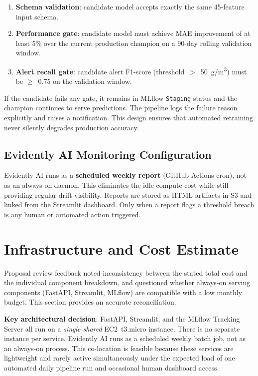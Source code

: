 \documentclass[12pt,a4paper]{report}
\begin{document}
\begin{enumerate}
  \item \textbf{Schema validation}: candidate model accepts exactly the same 45-feature input schema.
  \item \textbf{Performance gate}: candidate model must achieve MAE improvement of at least 5\% over the current production champion on a 90-day rolling validation window.
  \item \textbf{Alert recall gate}: candidate alert F1-score (threshold~$>$~50~\textmu g/m\textsuperscript{3}) must be $\geq$~0.75 on the validation window.
\end{enumerate}

If the candidate fails any gate, it remains in MLflow \texttt{Staging} status and the champion continues to serve predictions. The pipeline logs the failure reason explicitly and raises a notification. This design ensures that automated retraining never silently degrades production accuracy.

\subsection{Evidently AI Monitoring Configuration}

Evidently AI runs as a \textbf{scheduled weekly report} (GitHub Actions cron), not as an always-on daemon. This eliminates the idle compute cost while still providing regular drift visibility. Reports are stored as HTML artifacts in S3 and linked from the Streamlit dashboard. Only when a report flags a threshold breach is any human or automated action triggered.

\section{Infrastructure and Cost Estimate}

Proposal review feedback noted inconsistency between the stated total cost and the individual component breakdown, and questioned whether always-on serving components (FastAPI, Streamlit, MLflow) are compatible with a low monthly budget. This section provides an accurate reconciliation.

\textbf{Key architectural decision}: FastAPI, Streamlit, and the MLflow Tracking Server all run on a \textit{single shared} EC2~t3.micro instance. There is no separate instance per service. Evidently AI runs as a scheduled weekly batch job, not as an always-on process. This co-location is feasible because these services are lightweight and rarely active simultaneously under the expected load of one automated daily pipeline run and occasional human dashboard access.
\end{document}
